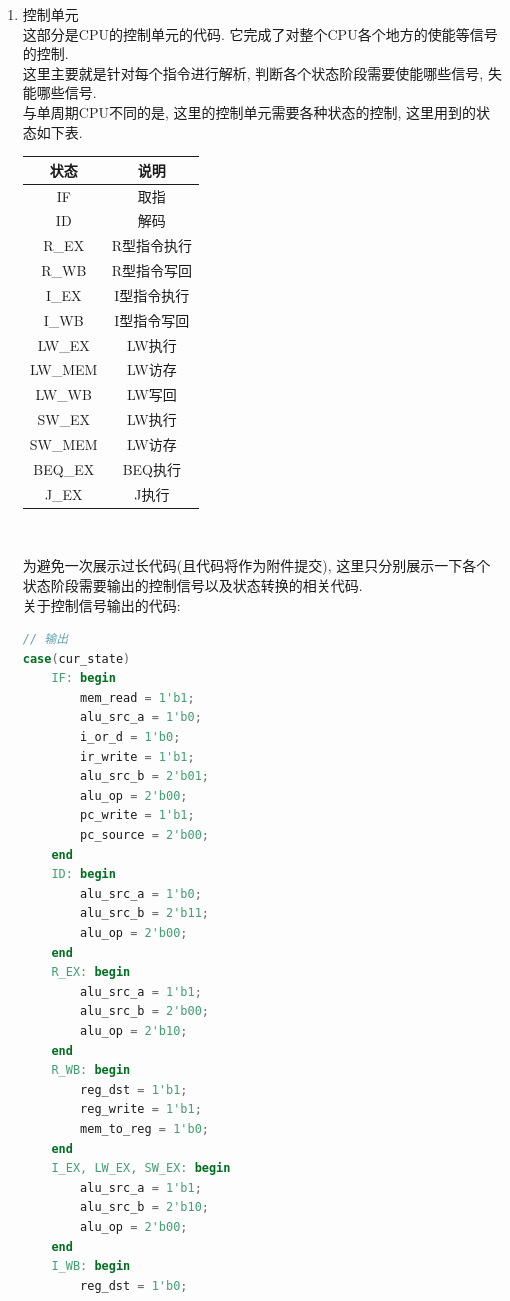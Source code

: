 \documentclass[UTF8]{article}
\newcommand{\jumpLine} {\hspace*{\fill} \par}
\begin{document}
\begin{enumerate}
	\item 控制单元\\
	这部分是CPU的控制单元的代码. 它完成了对整个CPU各个地方的使能等信号的控制.\\
	这里主要就是针对每个指令进行解析, 判断各个状态阶段需要使能哪些信号, 失能哪些信号.\\
	与单周期CPU不同的是, 这里的控制单元需要各种状态的控制, 这里用到的状态如下表.\\
	\jumpLine
	\begin{tabular}{|c|c|}
	\hline
	状态 & 说明 \\
	\hline
	IF & 取指 \\
	\hline
	ID & 解码 \\
	\hline
	R\_EX & R型指令执行 \\
	\hline
	R\_WB & R型指令写回 \\
	\hline
	I\_EX & I型指令执行 \\
	\hline
	I\_WB & I型指令写回 \\
	\hline
	LW\_EX & LW执行 \\
	\hline
	LW\_MEM & LW访存 \\
	\hline
	LW\_WB & LW写回 \\
	\hline
	SW\_EX & LW执行 \\
	\hline
	SW\_MEM & LW访存 \\
	\hline
	BEQ\_EX & BEQ执行 \\
	\hline
	J\_EX & J执行 \\
	\hline
	\end{tabular}\\
	\jumpLine
	为避免一次展示过长代码(且代码将作为附件提交), 这里只分别展示一下各个状态阶段需要输出的控制信号以及状态转换的相关代码.\\
	关于控制信号输出的代码:\\
	\begin{lstlisting}[language=verilog]
// 输出
case(cur_state)
    IF: begin
        mem_read = 1'b1;
        alu_src_a = 1'b0;
        i_or_d = 1'b0;
        ir_write = 1'b1;
        alu_src_b = 2'b01;
        alu_op = 2'b00;
        pc_write = 1'b1;
        pc_source = 2'b00;
    end
    ID: begin
        alu_src_a = 1'b0;
        alu_src_b = 2'b11;
        alu_op = 2'b00;
    end
    R_EX: begin
        alu_src_a = 1'b1;
        alu_src_b = 2'b00;
        alu_op = 2'b10;
    end
    R_WB: begin
        reg_dst = 1'b1;
        reg_write = 1'b1;
        mem_to_reg = 1'b0;
    end
    I_EX, LW_EX, SW_EX: begin
        alu_src_a = 1'b1;
        alu_src_b = 2'b10;
        alu_op = 2'b00;
    end
    I_WB: begin
        reg_dst = 1'b0;

\end{lstlisting}
\end{enumerate}
\end{document}
